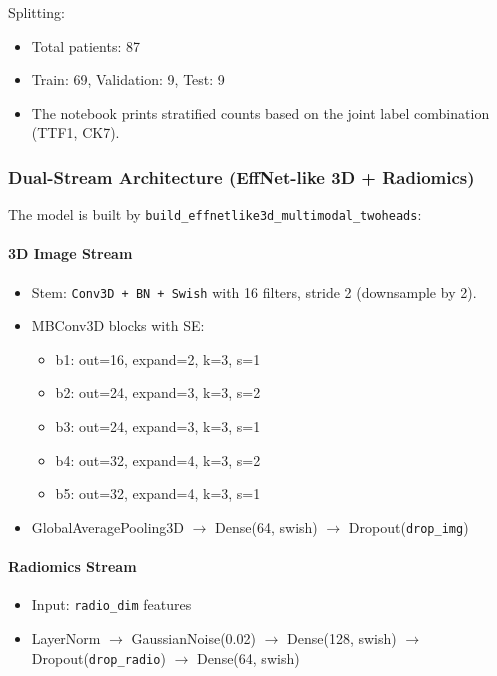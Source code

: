 Splitting:
\begin{itemize}
    \item Total patients: 87
    \item Train: 69, Validation: 9, Test: 9
    \item The notebook prints stratified counts based on the joint label combination (TTF1, CK7).
\end{itemize}

\subsubsection{Dual-Stream Architecture (EffNet-like 3D + Radiomics)}
The model is built by \texttt{build\_effnetlike3d\_multimodal\_twoheads}:

\paragraph{3D Image Stream}
\begin{itemize}
    \item Stem: \texttt{Conv3D + BN + Swish} with 16 filters, stride 2 (downsample by 2).
    \item MBConv3D blocks with SE:
    \begin{itemize}
        \item b1: out=16, expand=2, k=3, s=1
        \item b2: out=24, expand=3, k=3, s=2
        \item b3: out=24, expand=3, k=3, s=1
        \item b4: out=32, expand=4, k=3, s=2
        \item b5: out=32, expand=4, k=3, s=1
    \end{itemize}
    \item GlobalAveragePooling3D $\rightarrow$ Dense(64, swish) $\rightarrow$ Dropout(\texttt{drop\_img})
\end{itemize}

\paragraph{Radiomics Stream}
\begin{itemize}
    \item Input: \texttt{radio\_dim} features
    \item LayerNorm $\rightarrow$ GaussianNoise(0.02) $\rightarrow$ Dense(128, swish) $\rightarrow$ Dropout(\texttt{drop\_radio}) $\rightarrow$ Dense(64, swish)
\end{itemize}

